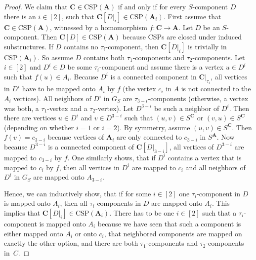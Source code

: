 \documentclass[a4paper,english, thm-restate]{lipics-v2021}
\newcommand{\vertA}{u}
\newcommand{\vertB}{v}
\newcommand{\sig}{\tau}
\newcommand{\StructA}{\mathbf{A}}
\newcommand{\StructC}{\mathbf{C}}
\newcommand{\CSP}[1]{\mathrm{CSP}(#1)}
\newcommand{\restrict}[2]{#1|_{#2}}
\begin{document}
\begin{proof}
		We claim that $\StructC \in \CSP{\StructA}$ if and only if
		for every $S$-component $D$ there is an $i\in[2]$, such that $\StructC[\restrict{D}{i}] \in \CSP{\StructA_i}$.
		First assume that $\StructC \in \CSP{\StructA}$,
		witnessed by a homomorphism $f \colon \StructC \to \StructA$.
		Let $D$ be an $S$-component.
		Then $\StructC[D] \in \CSP{\StructA}$ because CSPs are closed under induced substructures.
		If $D$ contains no $\sig_i$-component,
		then $\StructC[\restrict{D}{i}]$ is trivially in $\CSP{\StructA_i}$.
		So assume $D$ contains both $\sig_1$-components and $\sig_2$-components.
		Let $i\in[2]$ and $D^i \in D$ be some $\sig_i$-component
		and assume there is a vertex $\vertA \in D^i$ such that $f(\vertA) \in A_i$.
		Because $D^i$ is a connected component in $\restrict{\StructC}{\sig_i}$, all vertices in $D^i$ have to be mapped onto $A_i$ by $f$
		(the vertex $c_i$ in $A$ is not connected to the $A_i$ vertices).
		All neighbors of $D^i$ in $G_S$ are $\sig_{3-i}$-components
		(otherwise, a vertex was both, a $\sig_1$-vertex and a $\sig_2$-vertex).
		Let $D^{3-i}$ be such a neighbor of $D^i$.
		Then there are vertices $\vertA \in D^i$ and $\vertB \in D^{3-i}$
		such that $(\vertA,\vertB) \in S^\StructC$ or $(\vertB,\vertA) \in S^\StructC$ (depending on whether $i=1$ or $i=2$).
		By symmetry, assume $(\vertA,\vertB) \in S^\StructC$.
		Then $f(\vertB) = c_{3-i}$ because vertices of $\StructA_i$ are only connected to $c_{3-i}$ in $S^\StructA$.
		Now because $D^{3-i}$ is a connected component of $\StructC[\restrict{D}{3-i}]$,
		all vertices of $D^{3-i}$ are mapped to $c_{3-i}$ by $f$.
		One similarly shows, that if $D^i$ contains a vertex that is mapped to $c_i$
		by $f$, then all vertices in $D^i$ are mapped to $c_i$ and all
		neighbors of $D^i$ in $G_S$ are mapped onto $A_{3-i}$.
		
		Hence, we can inductively show,
		that if for some $i\in[2]$ one $\sig_i$-component in $D$ is mapped onto $A_i$,
		then all $\sig_i$-components in $D$ are mapped onto $A_i$. 
		This implies that  $\StructC[\restrict{D}{i}] \in \CSP{\StructA_i}$.
		There has to be one $i\in[2]$ such that  a $\sig_i$-component
		is mapped onto $A_i$ because
		we have seen that such a component is either mapped onto $A_i$ or onto $c_i$,
		that neighbored components are mapped on exactly the other option,
		and there are both $\sig_1$-components and $\sig_2$-components in~$C$.
		

\end{proof}
\end{document}
